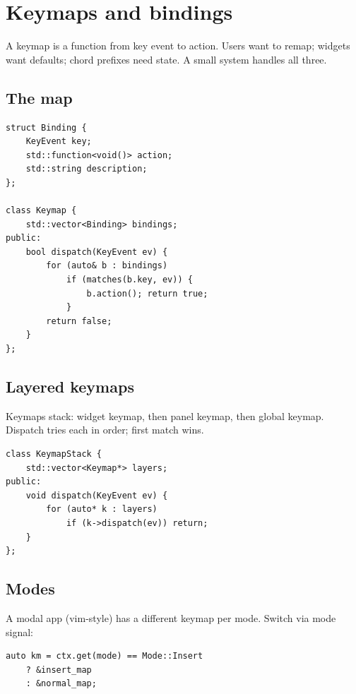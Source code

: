 \chapter{Keymaps and bindings}
\label{ch:keymaps}

\begin{aside}
A keymap is a function from key event to action. Users want
to remap; widgets want defaults; chord prefixes need state.
A small system handles all three.
\end{aside}

\section{The map}

\begin{lstlisting}
struct Binding {
    KeyEvent key;
    std::function<void()> action;
    std::string description;
};

class Keymap {
    std::vector<Binding> bindings;
public:
    bool dispatch(KeyEvent ev) {
        for (auto& b : bindings)
            if (matches(b.key, ev)) {
                b.action(); return true;
            }
        return false;
    }
};
\end{lstlisting}

\section{Layered keymaps}

Keymaps stack: widget keymap, then panel keymap, then
global keymap. Dispatch tries each in order; first match
wins.

\begin{lstlisting}
class KeymapStack {
    std::vector<Keymap*> layers;
public:
    void dispatch(KeyEvent ev) {
        for (auto* k : layers)
            if (k->dispatch(ev)) return;
    }
};
\end{lstlisting}

\section{Modes}

A modal app (vim-style) has a different keymap per mode.
Switch via mode signal:

\begin{lstlisting}
auto km = ctx.get(mode) == Mode::Insert
    ? &insert_map
    : &normal_map;
\end{lstlisting}

